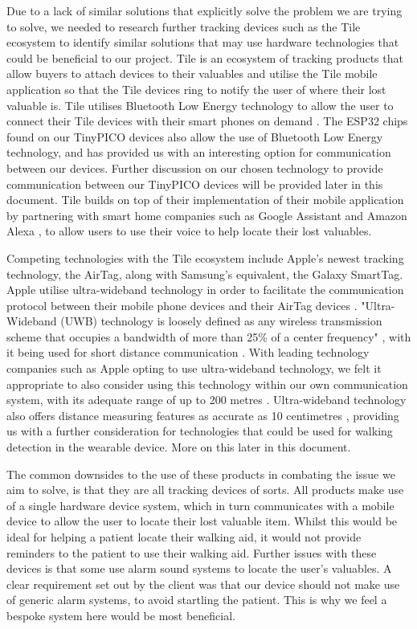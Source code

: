 Due to a lack of similar solutions that explicitly solve the problem we are trying to solve, we needed to research further tracking devices such as the Tile ecosystem to identify similar solutions that may use hardware technologies that could be beneficial to our project. Tile is an ecosystem of tracking products that allow buyers to attach devices to their valuables and utilise the Tile mobile application so that the Tile devices ring to notify the user of where their lost valuable is. Tile utilises Bluetooth Low Energy technology to allow the user to connect their Tile devices with their smart phones on demand \cite{hall_2021}. The ESP32 chips found on our TinyPICO devices also allow the use of Bluetooth Low Energy technology, and has provided us with an interesting option for communication between our devices. Further discussion on our chosen technology to provide communication between our TinyPICO devices will be provided later in this document. Tile builds on top of their implementation of their mobile application by partnering with smart home companies such as Google Assistant and Amazon Alexa \cite{hall_2021}, to allow users to use their voice to help locate their lost valuables. 

Competing technologies with the Tile ecosystem include Apple's newest tracking technology, the AirTag, along with Samsung's equivalent, the Galaxy SmartTag. Apple utilise ultra-wideband technology in order to facilitate the communication protocol between their mobile phone devices and their AirTag devices \cite{griffith_2021}. "Ultra-Wideband (UWB) technology is loosely defined as any wireless transmission scheme that occupies a bandwidth of more than 25\% of a center frequency" \cite{Foerster_ultra-widebandtechnology}, with it being used for short distance communication \cite{uwb}. With leading technology companies such as Apple opting to use ultra-wideband technology, we felt it appropriate to also consider using this technology within our own communication system, with its adequate range of up to 200 metres \cite{bleesk}. Ultra-wideband technology also offers distance measuring features as accurate as 10 centimetres \cite{bleesk}, providing us with a further consideration for technologies that could be used for walking detection in the wearable device. More on this later in this document. 

The common downsides to the use of these products in combating the issue we aim to solve, is that they are all tracking devices of sorts. All products make use of a single hardware device system, which in turn communicates with a mobile device to allow the user to locate their lost valuable item. Whilst this would be ideal for helping a patient locate their walking aid, it would not provide reminders to the patient to use their walking aid. Further issues with these devices is that some use alarm sound systems to locate the user's valuables. A clear requirement set out by the client was that our device should not make use of generic alarm systems, to avoid startling the patient. This is why we feel a bespoke system here would be most beneficial. 